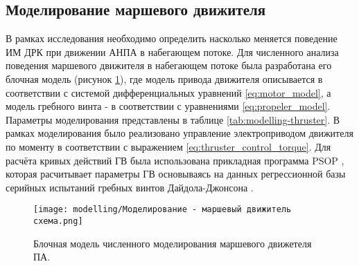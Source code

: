 \subsection{Моделирование маршевого движителя}
В рамках исследования необходимо определить насколько меняется поведение ИМ ДРК при движении АНПА в набегающем потоке.
Для численного анализа поведения маршевого движителя в набегающем потоке была разработана его блочная модель (рисунок \ref{fig:modelling-thruster}), где модель привода движителя описывается в соответствии с системой дифференциальных уравнений \ref{eq:motor_model}, а модель гребного винта - в соответствии с уравнениями \ref{eq:propeler_model}.
Параметры моделирования представлены в таблице \ref{tab:modelling-thruster}.
В рамках моделирования было реализовано управление электроприводом движителя по моменту в соответствии с выражением \ref{eq:thruster_control_torque}.
Для расчёта кривых действий ГВ была использована прикладная программа PSOP \cite{инзарцев2018подводные}, которая расчитывает параметры ГВ основываясь на данных регрессионной
базы серийных испытаний гребных винтов Дайдола-Джонсона \cite{daidola1992propeller}.

\begin{figure}[ht]
    \centering
    \texttt{[image: modelling/Моделирование - маршевый движитель схема.png]}
    \caption{Блочная модель численного моделирования маршевого движетеля ПА.}
    \label{fig:modelling-thruster}
\end{figure}

